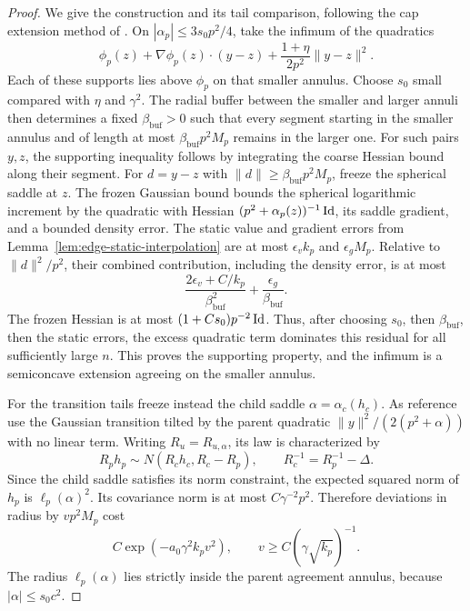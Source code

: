 \begin{proof}
We give the construction and its tail comparison, following the cap
extension method of \cite[Proposition~16.1]{CM}. On
$|\alpha_p|\le3s_0p^2/4$, take the infimum of the quadratics
\[
 \phi_p(z)+\nabla\phi_p(z)\cdot(y-z)
             +\frac{1+\eta}{2p^2}\|y-z\|^2.
\]
Each of these supports lies above $\phi_p$ on that smaller annulus.
Choose $s_0$ small compared with $\eta$ and $\gamma^2$. The radial buffer
between the smaller and larger annuli then determines a fixed
$\beta_{\mathrm{buf}}>0$ such that every segment starting in the smaller
annulus and of length at most $\beta_{\mathrm{buf}}p^2M_p$ remains in
the larger one. For such pairs $y,z$, the supporting inequality follows
by integrating the coarse Hessian bound along their segment.
For $d=y-z$ with $\|d\|\ge\beta_{\mathrm{buf}}p^2M_p$, freeze the
spherical saddle at $z$. The frozen Gaussian bound bounds the spherical
logarithmic increment by the quadratic with Hessian
$(p^2+\alpha_p(z))^{-1}\operatorname{Id}$, its saddle gradient, and a bounded density
error. The static value and gradient errors from
Lemma~\ref{lem:edge-static-interpolation} are at most
$\epsilon_v k_p$ and $\epsilon_gM_p$. Relative to $\|d\|^2/p^2$, their
combined contribution, including the density error, is at most
\[
 \frac{2\epsilon_v+C/k_p}{\beta_{\mathrm{buf}}^2}
       +\frac{\epsilon_g}{\beta_{\mathrm{buf}}}.
\]
The frozen Hessian is at most $(1+Cs_0)p^{-2}\operatorname{Id}$. Thus, after choosing
$s_0$, then $\beta_{\mathrm{buf}}$, then the static errors, the excess
quadratic term dominates this residual for all sufficiently large $n$.
This proves the supporting property,
and the infimum is a semiconcave extension agreeing on the smaller annulus.

For the transition tails freeze instead the child saddle
$\alpha=\alpha_c(h_c)$. As reference use the Gaussian transition tilted
by the parent quadratic $\|y\|^2/(2(p^2+\alpha))$ with no linear term.
Writing $R_u=R_{u,\alpha}$, its law is characterized by
\[
 R_ph_p\sim N(R_ch_c,R_c-R_p),
 \qquad R_c^{-1}=R_p^{-1}-\Delta.
\]
Since the child saddle satisfies its norm constraint, the expected squared
norm of $h_p$ is $\ell_p(\alpha)^2$. Its covariance norm is at most
$C\gamma^{-2}p^2$. Therefore deviations in radius by $vp^2M_p$ cost
\[
 C\exp(-a_0\gamma^2k_pv^2),
 \qquad v\ge C(\gamma\sqrt{k_p})^{-1}.
\]
The radius $\ell_p(\alpha)$ lies strictly inside the parent agreement
annulus, because $|\alpha|\le s_0c^2$.


\end{proof}
